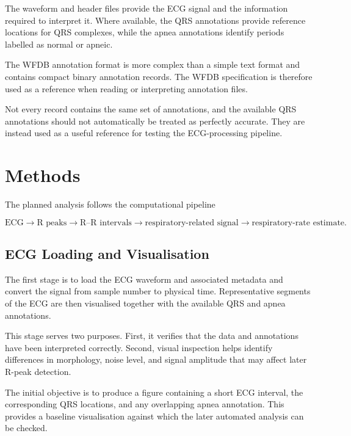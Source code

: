 The waveform and header files provide the ECG signal and the information
required to interpret it. Where available, the QRS annotations provide
reference locations for QRS complexes, while the apnea annotations identify
periods labelled as normal or apneic.

The WFDB annotation format is more complex than a simple text format and
contains compact binary annotation records. The WFDB specification
\cite{physionet_wfdb} is therefore used as a reference when reading or
interpreting annotation files.

Not every record contains the same set of annotations, and the available
QRS annotations should not automatically be treated as perfectly accurate.
They are instead used as a useful reference for testing the ECG-processing
pipeline.


\section{Methods}
\label{sec:methods}

The planned analysis follows the computational pipeline

\begin{equation}
\text{ECG}
\rightarrow
\text{R peaks}
\rightarrow
\text{R--R intervals}
\rightarrow
\text{respiratory-related signal}
\rightarrow
\text{respiratory-rate estimate}.
\label{eq:pipeline}
\end{equation}


\subsection{ECG Loading and Visualisation}
\label{subsec:loading}

The first stage is to load the ECG waveform and associated metadata and
convert the signal from sample number to physical time. Representative
segments of the ECG are then visualised together with the available QRS and
apnea annotations.

This stage serves two purposes. First, it verifies that the data and
annotations have been interpreted correctly. Second, visual inspection helps
identify differences in morphology, noise level, and signal amplitude that
may affect later R-peak detection.

The initial objective is to produce a figure containing a short ECG interval,
the corresponding QRS locations, and any overlapping apnea annotation. This
provides a baseline visualisation against which the later automated analysis
can be checked.



